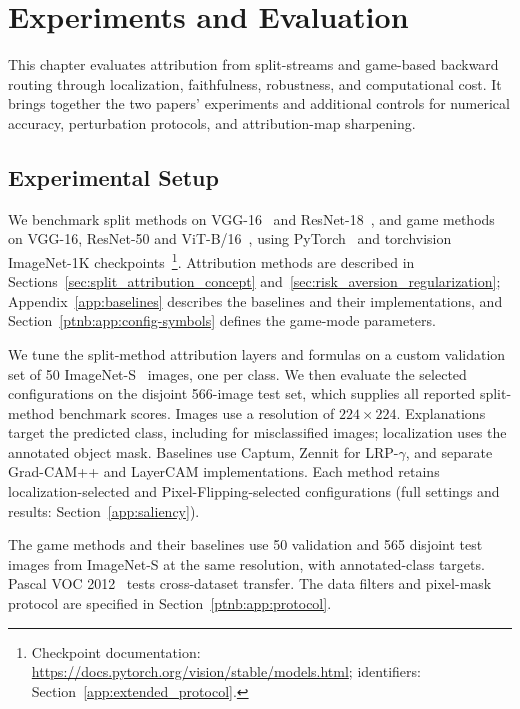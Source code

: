 \chapter{Experiments and Evaluation}\label{ch:experiments}

This chapter evaluates attribution from split-streams and game-based backward routing through localization, faithfulness, robustness, and computational cost. It brings together the two papers' experiments and additional controls for numerical accuracy, perturbation protocols, and attribution-map sharpening.

\section{Experimental Setup}\label{sec:experimental_setup}\label{sec:quantus_evaluation}

We benchmark split methods on VGG-16~\parencite{Simonyan2015} and ResNet-18~\parencite{He2016resnet}, and game methods on VGG-16, ResNet-50 and ViT-B/16~\parencite{Dosovitskiy2021vit}, using PyTorch~\parencite{Paszke2019PyTorch} and torchvision ImageNet-1K checkpoints~\parencite{Deng2009,Russakovsky2015ilsvrc}\footnote{Checkpoint documentation: \url{https://docs.pytorch.org/vision/stable/models.html}; identifiers: Section~\ref{app:extended_protocol}.}. Attribution methods are described in Sections~\ref{sec:split_attribution_concept} and~\ref{sec:risk_aversion_regularization}; Appendix~\ref{app:baselines} describes the baselines and their implementations, and Section~\ref{ptnb:app:config-symbols} defines the game-mode parameters.

We tune the split-method attribution layers and formulas on a custom validation set of 50 ImageNet-S~\parencite{gao2022luss} images, one per class. We then evaluate the selected configurations on the disjoint 566-image test set, which supplies all reported split-method benchmark scores. Images use a resolution of $224\times224$. Explanations target the predicted class, including for misclassified images; localization uses the annotated object mask. Baselines use Captum, Zennit for LRP-$\gamma$, and separate Grad-CAM++ and LayerCAM implementations. Each method retains localization-selected and Pixel-Flipping-selected configurations (full settings and results: Section~\ref{app:saliency}).

The game methods and their baselines use 50 validation and 565 disjoint test images from ImageNet-S at the same resolution, with annotated-class targets. Pascal VOC 2012~\parencite{Everingham2010voc} tests cross-dataset transfer. The data filters and pixel-mask protocol are specified in Section~\ref{ptnb:app:protocol}.

